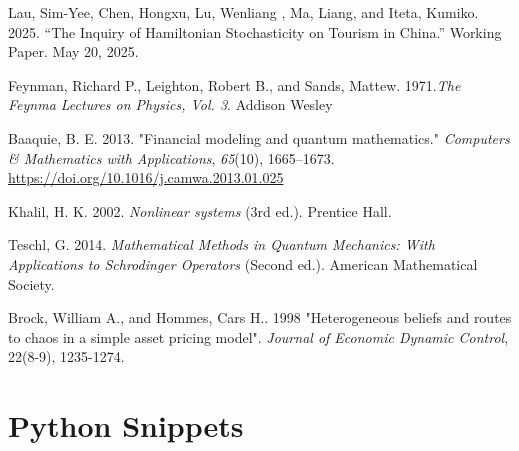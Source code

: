 \documentclass[9pt]{article}
\begin{document}
\begin{thebibliography}{99}

 Lau, Sim-Yee, Chen, Hongxu, Lu, Wenliang , Ma, Liang, and Iteta, Kumiko. 2025. “The Inquiry of Hamiltonian Stochasticity on Tourism in China.” Working Paper. May 20, 2025.

 Feynman, Richard P., Leighton, Robert B., and Sands, Mattew. 1971.\textit{The Feynma Lectures on Physics, Vol. 3}. Addison Wesley

 Baaquie, B. E. 2013. "Financial modeling and quantum mathematics." \textit{Computers \& Mathematics with Applications}, \textit{65}(10), 1665--1673. \url{https://doi.org/10.1016/j.camwa.2013.01.025}

 Khalil, H. K. 2002. \textit{Nonlinear systems} (3rd ed.). Prentice Hall.

 Teschl, G. 2014. \textit{Mathematical Methods in Quantum Mechanics: With Applications to Schrodinger Operators} (Second ed.). American Mathematical Society.

 Brock, William A., and Hommes, Cars H.. 1998 "Heterogeneous beliefs and routes to chaos in a simple asset pricing model". \textit{Journal of Economic Dynamic Control}, 22(8-9), 1235-1274.

\end{thebibliography}

\clearpage
\appendix
\section{Python Snippets}
\end{document}
